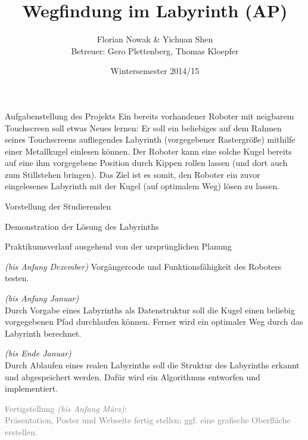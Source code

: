 \documentclass{beamer}
\title{Wegfindung im Labyrinth (AP)}
\author{\texorpdfstring{Florian Nowak \& Yichuan Shen\\ Betreuer: Gero Plettenberg, Thomas Kloepfer}{Florian Nowak \& Yichuan Shen}}
\date{Wintersemester 2014/15}
\begin{document}
\maketitle

\begin{frame}[fragile,t]{Aufgabenstellung des Projekts}
Ein bereits vorhandener Roboter mit neigbarem Touchscreen soll etwas Neues lernen: Er soll ein beliebiges auf dem Rahmen seines Touchscreens aufliegendes Labyrinth (vorgegebener Rastergröße) mithilfe einer Metallkugel einlesen können. Der Roboter kann eine solche Kugel bereits auf eine ihm vorgegebene Position durch Kippen rollen lassen (und dort auch zum Stillstehen bringen). Das Ziel ist es somit, den Roboter ein zuvor eingelesenes Labyrinth mit der Kugel (auf optimalem Weg) lösen zu lassen.

\medskip\noindent
{}
\end{frame}

\begin{frame}[fragile,t]{Vorstellung der Studierenden}
\end{frame}

\begin{frame}[fragile,t]{Demonstration der Lösung des Labyrinths}
\end{frame}

\begin{frame}[fragile,t]{Praktikumsverlauf ausgehend von der ursprünglichen Planung}

\smallskip
\begin{enumerate}
 \item {} \textit{(bis Anfang Dezember)}\blue{:} Vorgängercode und Funktionsfähigkeit des Roboters testen.
 \item {} \textit{(bis Anfang Januar)}\blue{:}\\
 Durch Vorgabe eines Labyrinths als Datenstruktur soll die Kugel einen beliebig vorgegebenen Pfad durchlaufen können. Ferner wird ein optimaler Weg durch das Labyrinth berechnet.
 \item {} \textit{(bis Ende Januar)}\blue{:}\\
 Durch Ablaufen eines realen Labyrinths soll die Struktur des Labyrinths erkannt und abgespeichert werden. Dafür wird ein Algorithmus entworfen und implementiert.
 \textcolor{gray}{
 \item[\textcolor{gray}{4.}] Fertigstellung \textit{(bis Anfang März)}:\\
Präsentation, Poster und Webseite fertig stellen; ggf. eine grafische Oberfläche erstellen.
}
\end{enumerate}
\end{frame}
\end{document}
